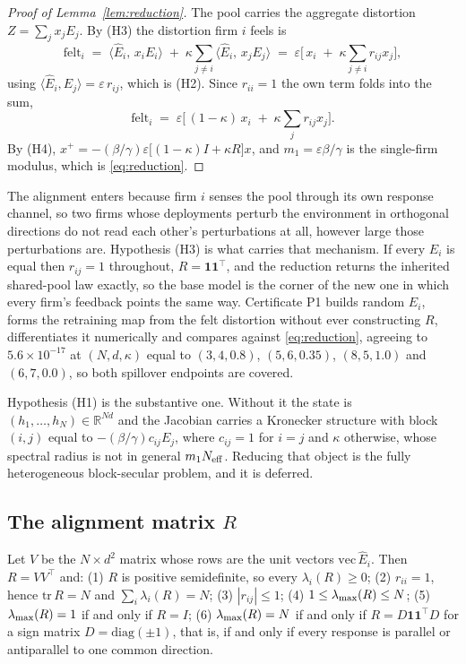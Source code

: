 \begin{proof}[Proof of Lemma~\ref{lem:reduction}]
The pool carries the aggregate distortion $Z = \sum_j x_j E_j$. By (H3) the distortion firm $i$ feels is
\[
  \mathrm{felt}_i \;=\; \langle \hat{E}_i,\, x_i E_i\rangle \;+\; \kappa \sum_{j \neq i} \langle \hat{E}_i,\, x_j E_j\rangle
  \;=\; \varepsilon\Big[\, x_i \;+\; \kappa \sum_{j\neq i} r_{ij} x_j \Big],
\]
using $\langle \hat{E}_i, E_j\rangle = \varepsilon\, r_{ij}$, which is (H2). Since $r_{ii}=1$ the own term folds into the sum,
\[
  \mathrm{felt}_i \;=\; \varepsilon\Big[\,(1-\kappa)\, x_i \;+\; \kappa \sum_j r_{ij} x_j \Big].
\]
By (H4), $x^{+} = -(\beta/\gamma)\varepsilon\big[(1-\kappa)I + \kappa R\big]x$, and $m_1 = \varepsilon\beta/\gamma$ is the single-firm modulus, which is \eqref{eq:reduction}.
\end{proof}

The alignment enters because firm $i$ senses the pool through its own response channel, so two firms whose deployments perturb the environment in orthogonal directions do not read each other's perturbations at all, however large those perturbations are. Hypothesis (H3) is what carries that mechanism. If every $E_i$ is equal then $r_{ij}=1$ throughout, $R = \mathbf{1}\mathbf{1}^{\top}$, and the reduction returns the inherited shared-pool law exactly, so the base model is the corner of the new one in which every firm's feedback points the same way. Certificate P1 builds random $E_i$, forms the retraining map from the felt distortion without ever constructing $R$, differentiates it numerically and compares against \eqref{eq:reduction}, agreeing to $5.6\times 10^{-17}$ at $(N,d,\kappa)$ equal to $(3,4,0.8)$, $(5,6,0.35)$, $(8,5,1.0)$ and $(6,7,0.0)$, so both spillover endpoints are covered.

Hypothesis (H1) is the substantive one. Without it the state is $(h_1,\ldots,h_N) \in \mathbb{R}^{Nd}$ and the Jacobian carries a Kronecker structure with block $(i,j)$ equal to $-(\beta/\gamma)c_{ij}E_j$, where $c_{ij}=1$ for $i=j$ and $\kappa$ otherwise, whose spectral radius is not in general $m_1 N_{\mathrm{eff}}$. Reducing that object is the fully heterogeneous block-secular problem, and it is deferred.

\subsection{The alignment matrix \texorpdfstring{$R$}{R}}

\begin{alemma}
\label{alem:Rprops}
Let $V$ be the $N \times d^2$ matrix whose rows are the unit vectors $\mathrm{vec}\,\hat{E}_i$. Then $R = VV^{\top}$ and:
(1) $R$ is positive semidefinite, so every $\lambda_i(R)\geq 0$;
(2) $r_{ii}=1$, hence $\mathrm{tr}\,R = N$ and $\sum_i \lambda_i(R) = N$;
(3) $|r_{ij}|\leq 1$;
(4) $1 \leq \lambda_{\max}(R) \leq N$;
(5) $\lambda_{\max}(R)=1$ if and only if $R=I$;
(6) $\lambda_{\max}(R)=N$ if and only if $R = D\mathbf{1}\mathbf{1}^{\top}D$ for a sign matrix $D=\mathrm{diag}(\pm 1)$, that is, if and only if every response is parallel or antiparallel to one common direction.
\end{alemma}

